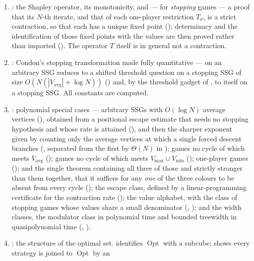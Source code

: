 \documentclass[11pt]{article}
\theoremstyle{plain}
\theoremstyle{definition}
\DeclareMathOperator{\Opt}{Opt}
\newcommand{\Vmax}{V_{\max}}
\newcommand{\Vmin}{V_{\min}}
\newcommand{\Vavg}{V_{\mathrm{avg}}}
\begin{document}
\begin{enumerate}[label=(\roman*),leftmargin=2.2em]
\item {}: the Shapley operator, its
  monotonicity, and --- for \emph{stopping} games --- a proof that its
  $N$-th iterate, and that of each one-player restriction $T_\sigma$, is a
  strict contraction, so that each has a unique fixed point
  (); determinacy and the identification of those
  fixed points with the values are then proved rather than imported
  (). The operator $T$ itself is in general
  not a contraction.
\item {}: Condon's stopping transformation made fully
  quantitative ---  on an arbitrary SSG reduces to a
  shifted threshold question on a stopping SSG of size
  $O(N(|\Vavg|+\log N))$ () and, by the
  threshold gadget of , to 
  itself on a stopping SSG. All constants are computed.
\item {}: polynomial special cases --- arbitrary SSGs
  with $O(\log N)$ average vertices (), obtained from a
  positional escape estimate that needs no stopping hypothesis and whose
  rate is attained (), and then the sharper
  exponent given by counting only the average vertices at which a single
  forced descent branches (, separated from the
  first by $\Theta(N)$ in ); games no cycle of which
  meets $\Vavg$ (); games no cycle of which meets
  $\Vmax\cup\Vmin$ (); one-player games
  (); and the single theorem containing all three of
  those and strictly stronger than them together, that it suffices for
  any \emph{one} of the three colours to be absent from every cycle
  (); the escape class, defined by
  a linear-programming certificate for the contraction rate
  (); the value alphabet, with the class of
  stopping games whose values share a small denominator
  (, ); and the width
  classes, the modulator class in polynomial time and bounded treewidth
  in quasipolynomial time (, ).
\item {}: the structure of the optimal set.
   identifies $\Opt$ with a subcube;
   shows every strategy is joined to $\Opt$ by an

\end{enumerate}
\end{document}
